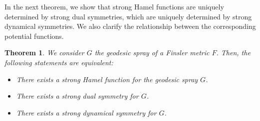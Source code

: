 \documentclass[oneside,english]{amsart}
\newtheorem{theorem}{Theorem}[section]
\theoremstyle{definition}
\theoremstyle{plain}
\theoremstyle{plain}
\theoremstyle{plain}
\theoremstyle{remark}
\theoremstyle{remark}
\theoremstyle{remark}
\begin{document}
In the next theorem, we show that strong Hamel functions are uniquely determined by strong dual symmetries, which are uniquely determined by strong dynamical symmetries. We also clarify the relationship between the corresponding potential functions.

\begin{theorem}\label{thm:SHF}
We consider $G$ the geodesic spray of a Finsler metric $F$. Then, the following statements are equivalent:
\begin{itemize}
\item[i)] There exists a strong Hamel function for the geodesic spray $G$.
\item[ii)] There exists a strong dual symmetry for $G$.
\item[iii)] There exists a strong dynamical symmetry for $G$.
\end{itemize}
\end{theorem}
\end{document}
